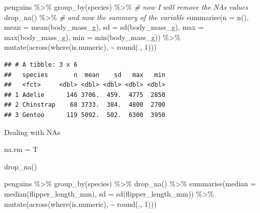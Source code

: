 \documentclass[
]{article}
\newenvironment{Shaded}{\begin{snugshade}}{\end{snugshade}}
\newcommand{\AttributeTok}[1]{\textcolor[rgb]{0.77,0.63,0.00}{#1}}
\newcommand{\CommentTok}[1]{\textcolor[rgb]{0.56,0.35,0.01}{\textit{#1}}}
\newcommand{\DecValTok}[1]{\textcolor[rgb]{0.00,0.00,0.81}{#1}}
\newcommand{\FunctionTok}[1]{\textcolor[rgb]{0.00,0.00,0.00}{#1}}
\newcommand{\NormalTok}[1]{#1}
\newcommand{\SpecialCharTok}[1]{\textcolor[rgb]{0.00,0.00,0.00}{#1}}
\begin{document}
\begin{Shaded}
\begin{Highlighting}[]
\NormalTok{penguins }\SpecialCharTok{\%\textgreater{}\%} 
  \FunctionTok{group\_by}\NormalTok{(species) }\SpecialCharTok{\%\textgreater{}\%} 
  \CommentTok{\# now I will remove the NAs values}
  \FunctionTok{drop\_na}\NormalTok{() }\SpecialCharTok{\%\textgreater{}\%} 
  \CommentTok{\# and now the summary of the variable}
  \FunctionTok{summarise}\NormalTok{(}\AttributeTok{n =} \FunctionTok{n}\NormalTok{(), }
            \AttributeTok{mean =} \FunctionTok{mean}\NormalTok{(body\_mass\_g),}
            \AttributeTok{sd =} \FunctionTok{sd}\NormalTok{(body\_mass\_g), }
            \AttributeTok{max =} \FunctionTok{max}\NormalTok{(body\_mass\_g), }
            \AttributeTok{min =} \FunctionTok{min}\NormalTok{(body\_mass\_g)) }\SpecialCharTok{\%\textgreater{}\%} 
  \FunctionTok{mutate}\NormalTok{(}\FunctionTok{across}\NormalTok{(}\FunctionTok{where}\NormalTok{(is.numeric), }\SpecialCharTok{\textasciitilde{}} \FunctionTok{round}\NormalTok{(., }\DecValTok{1}\NormalTok{)))}
\end{Highlighting}
\end{Shaded}

\begin{verbatim}
## # A tibble: 3 x 6
##   species       n  mean    sd   max   min
##   <fct>     <dbl> <dbl> <dbl> <dbl> <dbl>
## 1 Adelie      146 3706.  459.  4775  2850
## 2 Chinstrap    68 3733.  384.  4800  2700
## 3 Gentoo      119 5092.  502.  6300  3950
\end{verbatim}

Dealing with NAs

na.rm = T

drop\_na()

\begin{Shaded}
\begin{Highlighting}[]
\NormalTok{penguins }\SpecialCharTok{\%\textgreater{}\%} 
  \FunctionTok{group\_by}\NormalTok{(species) }\SpecialCharTok{\%\textgreater{}\%} 
  \FunctionTok{drop\_na}\NormalTok{() }\SpecialCharTok{\%\textgreater{}\%} 
  \FunctionTok{summarise}\NormalTok{(}\AttributeTok{median =} \FunctionTok{median}\NormalTok{(flipper\_length\_mm), }
            \AttributeTok{sd =} \FunctionTok{sd}\NormalTok{(flipper\_length\_mm)) }\SpecialCharTok{\%\textgreater{}\%} 
  \FunctionTok{mutate}\NormalTok{(}\FunctionTok{across}\NormalTok{(}\FunctionTok{where}\NormalTok{(is.numeric), }\SpecialCharTok{\textasciitilde{}} \FunctionTok{round}\NormalTok{(., }\DecValTok{1}\NormalTok{)))}
\end{Highlighting}
\end{Shaded}
\end{document}
